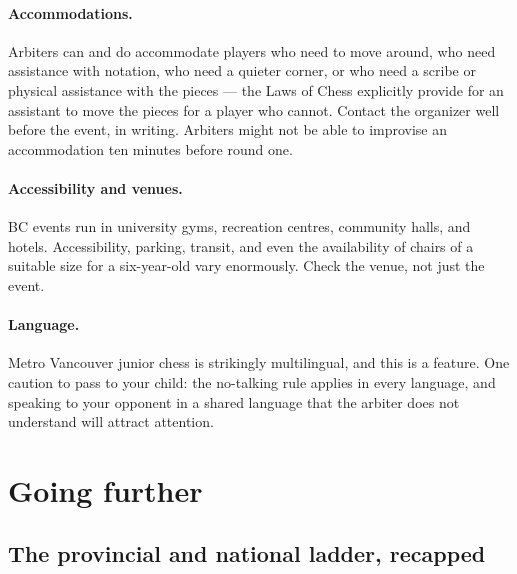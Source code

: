\documentclass[10pt,letterpaper]{article}
\begin{document}
\paragraph{Accommodations.} Arbiters can and do accommodate players who need to
move around, who need assistance with notation, who need a quieter corner, or who
need a scribe or physical assistance with the pieces --- the Laws of Chess
explicitly provide for an assistant to move the pieces for a player who cannot.
Contact the organizer well before the event, in writing. Arbiters might
not be able to improvise an accommodation ten minutes before round one.

\paragraph{Accessibility and venues.} BC events run in university gyms,
recreation centres, community halls, and hotels. Accessibility, parking,
transit, and even the availability of chairs of a suitable size for a
six-year-old vary enormously. Check the venue, not just the event.

\paragraph{Language.} Metro Vancouver junior chess is strikingly multilingual,
and this is a feature. One caution to pass to your child: the no-talking rule
applies in every language, and speaking to your opponent in a shared language
that the arbiter does not understand will attract attention.

\section{Going further}

\subsection{The provincial and national ladder, recapped}
\end{document}
